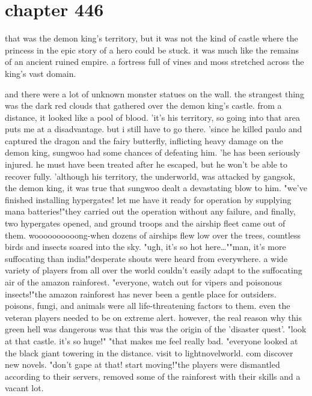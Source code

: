 \section{chapter 446}

that was the demon king's territory, but it was not the kind of castle where the princess in the epic story of a hero could be stuck.
 it was much like the remains of an ancient ruined empire.
 a fortress full of vines and moss stretched across the king's vast domain.
 




and there were a lot of unknown monster statues on the wall.
the strangest thing was the dark red clouds that gathered over the demon king's castle.
 from a distance, it looked like a pool of blood.
'it's his territory, so going into that area puts me at a disadvantage.
 but i still have to go there.
'since he killed paulo and captured the dragon and the fairy butterfly, inflicting heavy damage on the demon king, sungwoo had some chances of defeating him.
'he has been seriously injured.
 he must have been treated after he escaped, but he won't be able to recover fully.
'although his territory, the underworld, was attacked by gangsok, the demon king, it was true that sungwoo dealt a devastating blow to him.
"we've finished installing hypergates! let me have it ready for operation by supplying mana batteries!"they carried out the operation without any failure, and finally, two hypergates opened, and ground troops and the airship fleet came out of them.
 woooooooooong-when dozens of airships flew low over the trees, countless birds and insects soared into the sky.
"ugh, it's so hot here…""man, it's more suffocating than india!"desperate shouts were heard from everywhere.
 a wide variety of players from all over the world couldn't easily adapt to the suffocating air of the amazon rainforest.
"everyone, watch out for vipers and poisonous insects!"the amazon rainforest has never been a gentle place for outsiders.
 poisons, fungi, and animals were all life-threatening factors to them.
 even the veteran players needed to be on extreme alert.
however, the real reason why this green hell was dangerous was that this was the origin of the 'disaster quest'.
"look at that castle.
 it's so huge!" 
"that makes me feel really bad.
"everyone looked at the black giant towering in the distance.
visit to lightnovelworld.
com discover new novels.
"don't gape at that! start moving!"the players were dismantled according to their servers, removed some of the rainforest with their skills and a vacant lot.
